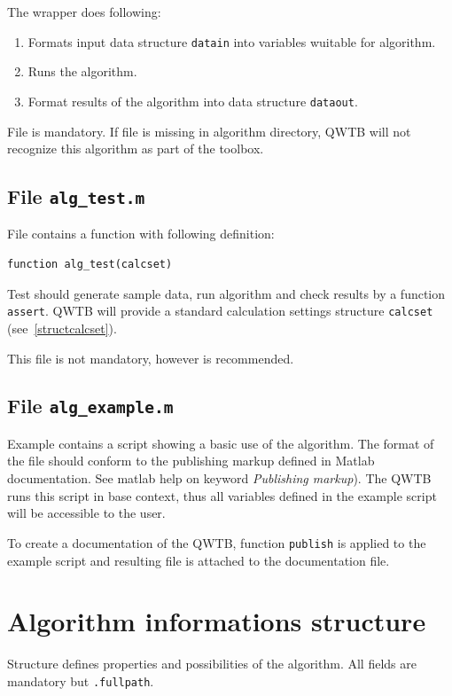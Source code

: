 \documentclass[12pt,a4paper,oneside]{report} %
\begin{document}
The wrapper does following:
\begin{enumerate}
        \item Formats input data structure \lstinline{datain} into variables wuitable for algorithm.
        \item Runs the algorithm.
        \item Format results of the algorithm into data structure \lstinline{dataout}.
\end{enumerate}

File is mandatory. If file is missing in algorithm directory, QWTB will not recognize this
algorithm as part of the toolbox.

\subsection{File {\tt alg\_test.m}} %
\label{filealgtest}
File contains a function with following definition:

\begin{lstlisting}
function alg_test(calcset)
\end{lstlisting}

Test should generate sample data, run algorithm and check results by a function \lstinline{assert}.
QWTB will provide a standard calculation settings structure \lstinline{calcset} (see~\ref{structcalcset}).

This file is not mandatory, however is recommended.

\subsection{File {\tt alg\_example.m}} %
\label{filealgexample}

Example contains a script showing a basic use of the algorithm. The format of the file should
conform to the publishing markup defined in Matlab documentation. See matlab help on keyword
\emph{Publishing markup}). The QWTB runs this script in base context, thus all variables defined in
the example script will be accessible to the user.

To create a documentation of the QWTB, function \lstinline{publish} is applied to the example script
and resulting file is attached to the documentation file.

\section{Algorithm informations structure} %
\label{structalginfo}
Structure defines properties and possibilities of the algorithm. All fields are mandatory but
\lstinline{.fullpath}.
\end{document}
